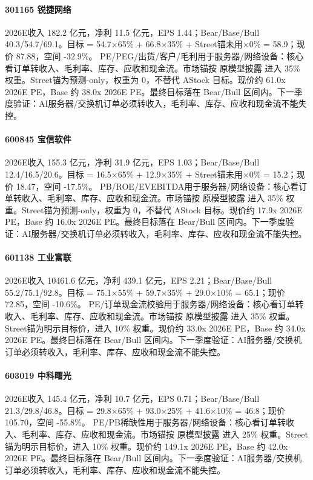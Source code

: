 \paragraph{301165 锐捷网络} 2026E收入 182.2 亿元，净利 11.5 亿元，EPS 1.44；Bear/Base/Bull 40.3/54.7/69.1。目标 = 54.7×65\% + 66.8×35\% + Street锚未用×0\% = 58.9；现价 87.88，空间 -32.9\%。 PE/PEG/出货/客户/毛利用于服务器/网络设备：核心看订单转收入、毛利率、库存、应收和现金流。市场锚按 原模型披露 进入 35\% 权重。Street锚为预测-only，权重为 0，不替代 AStock 目标。现价约 61.0x 2026E PE，Base 约 38.0x 2026E PE。最终目标落在 Bear/Bull 区间内。下一季度验证：AI服务器/交换机订单必须转收入，毛利率、库存、应收和现金流不能失控。
\paragraph{600845 宝信软件} 2026E收入 155.3 亿元，净利 31.9 亿元，EPS 1.03；Bear/Base/Bull 12.4/16.5/20.6。目标 = 16.5×65\% + 12.9×35\% + Street锚未用×0\% = 15.2；现价 18.47，空间 -17.5\%。 PB/ROE/EVEBITDA用于服务器/网络设备：核心看订单转收入、毛利率、库存、应收和现金流。市场锚按 原模型披露 进入 35\% 权重。Street锚为预测-only，权重为 0，不替代 AStock 目标。现价约 17.9x 2026E PE，Base 约 16.0x 2026E PE。最终目标落在 Bear/Bull 区间内。下一季度验证：AI服务器/交换机订单必须转收入，毛利率、库存、应收和现金流不能失控。
\paragraph{601138 工业富联} 2026E收入 10461.6 亿元，净利 439.1 亿元，EPS 2.21；Bear/Base/Bull 55.2/75.1/92.8。目标 = 75.1×55\% + 59.7×35\% + 29.0×10\% = 65.1；现价 72.85，空间 -10.6\%。 PE/订单现金流校验用于服务器/网络设备：核心看订单转收入、毛利率、库存、应收和现金流。市场锚按 原模型披露 进入 35\% 权重。Street锚为明示目标价，进入 10\% 权重。现价约 33.0x 2026E PE，Base 约 34.0x 2026E PE。最终目标落在 Bear/Bull 区间内。下一季度验证：AI服务器/交换机订单必须转收入，毛利率、库存、应收和现金流不能失控。
\paragraph{603019 中科曙光} 2026E收入 145.4 亿元，净利 10.7 亿元，EPS 0.71；Bear/Base/Bull 21.3/29.8/46.8。目标 = 29.8×65\% + 93.0×25\% + 41.6×10\% = 46.8；现价 105.70，空间 -55.8\%。 PE/PB稀缺性用于服务器/网络设备：核心看订单转收入、毛利率、库存、应收和现金流。市场锚按 原模型披露 进入 25\% 权重。Street锚为明示目标价，进入 10\% 权重。现价约 149.1x 2026E PE，Base 约 42.0x 2026E PE。最终目标落在 Bear/Bull 区间内。下一季度验证：AI服务器/交换机订单必须转收入，毛利率、库存、应收和现金流不能失控。
